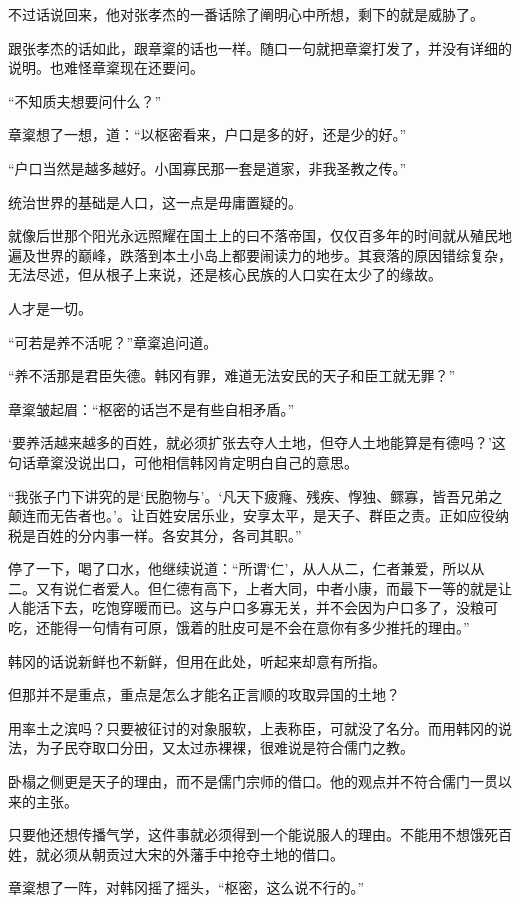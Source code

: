不过话说回来，他对张孝杰的一番话除了阐明心中所想，剩下的就是威胁了。

跟张孝杰的话如此，跟章楶的话也一样。随口一句就把章楶打发了，并没有详细的说明。也难怪章楶现在还要问。

“不知质夫想要问什么？”

章楶想了一想，道：“以枢密看来，户口是多的好，还是少的好。”

“户口当然是越多越好。小国寡民那一套是道家，非我圣教之传。”

统治世界的基础是人口，这一点是毋庸置疑的。

就像后世那个阳光永远照耀在国土上的曰不落帝国，仅仅百多年的时间就从殖民地遍及世界的巅峰，跌落到本土小岛上都要闹读力的地步。其衰落的原因错综复杂，无法尽述，但从根子上来说，还是核心民族的人口实在太少了的缘故。

人才是一切。

“可若是养不活呢？”章楶追问道。

“养不活那是君臣失德。韩冈有罪，难道无法安民的天子和臣工就无罪？”

章楶皱起眉：“枢密的话岂不是有些自相矛盾。”

‘要养活越来越多的百姓，就必须扩张去夺人土地，但夺人土地能算是有德吗？’这句话章楶没说出口，可他相信韩冈肯定明白自己的意思。

“我张子门下讲究的是‘民胞物与’。‘凡天下疲癃、残疾、惸独、鳏寡，皆吾兄弟之颠连而无告者也。’。让百姓安居乐业，安享太平，是天子、群臣之责。正如应役纳税是百姓的分内事一样。各安其分，各司其职。”

停了一下，喝了口水，他继续说道：“所谓‘仁’，从人从二，仁者兼爱，所以从二。又有说仁者爱人。但仁德有高下，上者大同，中者小康，而最下一等的就是让人能活下去，吃饱穿暖而已。这与户口多寡无关，并不会因为户口多了，没粮可吃，还能得一句情有可原，饿着的肚皮可是不会在意你有多少推托的理由。”

韩冈的话说新鲜也不新鲜，但用在此处，听起来却意有所指。

但那并不是重点，重点是怎么才能名正言顺的攻取异国的土地？

用率土之滨吗？只要被征讨的对象服软，上表称臣，可就没了名分。而用韩冈的说法，为子民夺取口分田，又太过赤裸裸，很难说是符合儒门之教。

卧榻之侧更是天子的理由，而不是儒门宗师的借口。他的观点并不符合儒门一贯以来的主张。

只要他还想传播气学，这件事就必须得到一个能说服人的理由。不能用不想饿死百姓，就必须从朝贡过大宋的外藩手中抢夺土地的借口。

章楶想了一阵，对韩冈摇了摇头，“枢密，这么说不行的。”

